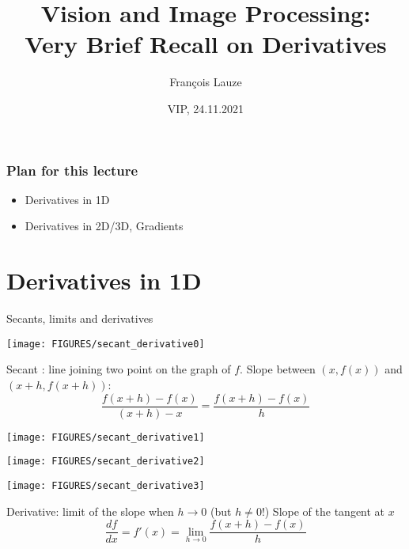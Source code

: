 \documentclass[8pt,dvipsnames]{beamer}
\title{Vision and Image Processing:\\ Very Brief Recall on Derivatives}
\author[F.~Lauze] %
{Fran{\c c}ois Lauze}
\institute[DIKU] %
{
  Department of Computer Science\\
  University of Copenhagen
}
\date[2020-21 B2]{VIP, 24.11.2021}
\begin{document}
\maketitle







 
  

\begin{frame}
  \frametitle{Plan for this lecture}
  \begin{itemize}
  \item Derivatives in 1D
  \item Derivatives in 2D/3D, Gradients
  \end{itemize}
\end{frame}


\section{Derivatives in 1D}

\begin{frame}{Secants, limits and derivatives}
  \begin{overprint}   
        \begin{center}
          \texttt{[image: FIGURES/secant\_derivative0]}
        \end{center}
        Secant : line joining two point on the graph of $f$. Slope between $(x, f(x))$ and $(x+h, f(x+h))$:
        $$
          \frac{f(x+h)-f(x)}{(x+h)-x} = \frac{f(x+h)-f(x)}{h}
        $$
        \begin{center}
          \texttt{[image: FIGURES/secant\_derivative1]}
        \end{center}
        \begin{center}
          \texttt{[image: FIGURES/secant\_derivative2]}
        \end{center}
        \begin{center}
          \texttt{[image: FIGURES/secant\_derivative3]}
        \end{center}  
        Derivative: limit of the slope when $h\to 0$ (but $h\not = 0$!) Slope of the tangent at $x$
        $$
          \frac{df}{dx} = f'(x) = \lim_{h\to 0} \frac{f(x+h)-f(x)}{h}
        $$
        \begin{center}
        \end{center}
  \end{overprint}
\end{frame}
\end{document}
